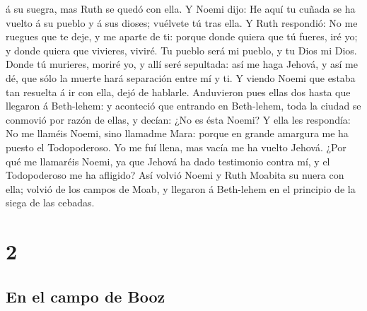 á su suegra, mas Ruth se quedó con ella.  Y Noemi dijo: He
aquí tu cuñada se ha vuelto á su pueblo y á sus dioses; vuélvete tú tras
ella.  Y Ruth respondió: No me ruegues que te deje, y me
aparte de ti: porque donde quiera que tú fueres, iré yo; y donde quiera
que vivieres, viviré. Tu pueblo será mi pueblo, y tu Dios mi Dios.
 Donde tú murieres, moriré yo, y allí seré sepultada: así
me haga Jehová, y así me dé, que sólo la muerte hará separación entre mí
y ti.  Y viendo Noemi que estaba tan resuelta á ir con
ella, dejó de hablarle.  Anduvieron pues ellas dos hasta
que llegaron á Beth-lehem: y aconteció que entrando en Beth-lehem, toda
la ciudad se conmovió por razón de ellas, y decían: ¿No es ésta Noemi?
 Y ella les respondía: No me llaméis Noemi, sino llamadme
Mara: porque en grande amargura me ha puesto el Todopoderoso.
 Yo me fuí llena, mas vacía me ha vuelto Jehová. ¿Por qué
me llamaréis Noemi, ya que Jehová ha dado testimonio contra mí, y el
Todopoderoso me ha afligido?  Así volvió Noemi y Ruth
Moabita su nuera con ella; volvió de los campos de Moab, y llegaron á
Beth-lehem en el principio de la siega de las cebadas.

\hypertarget{section-1}{%
\section{2}\label{section-1}}

\hypertarget{en-el-campo-de-booz}{%
\subsection{En el campo de Booz}\label{en-el-campo-de-booz}}

